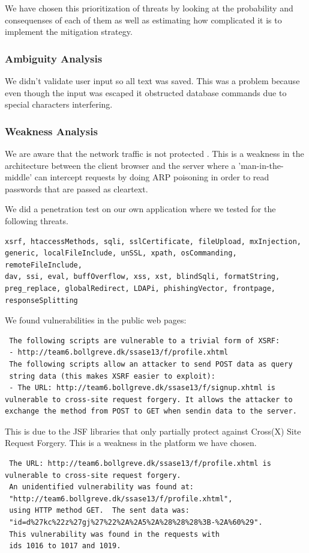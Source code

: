 \documentclass[a4paper]{article}
\begin{document}
We have chosen this prioritization of threats by looking at the probability and consequenses of each of them as well as estimating how complicated it is to implement the mitigation strategy.



\subsubsection{Ambiguity Analysis}

We didn't validate user input so all text was saved. This was a problem because even though the input was escaped it obstructed database commands due to special characters interfering.

\subsubsection{Weakness Analysis}
We are aware that the network traffic is not protected \cite{sins2009}. This is a weakness in the architecture between the client browser and the server where a 'man-in-the-middle' can intercept requests by doing ARP poisoning in order to read passwords that are passed as cleartext.

We did a penetration test on our own application where we tested for the following threats.

\begin{verbatim}
xsrf, htaccessMethods, sqli, sslCertificate, fileUpload, mxInjection, 
generic, localFileInclude, unSSL, xpath, osCommanding, remoteFileInclude, 
dav, ssi, eval, buffOverflow, xss, xst, blindSqli, formatString, 
preg_replace, globalRedirect, LDAPi, phishingVector, frontpage, 
responseSplitting
\end{verbatim}
     
We found vulnerabilities in the public web pages:
\begin{verbatim}
 The following scripts are vulnerable to a trivial form of XSRF:
 - http://team6.bollgreve.dk/ssase13/f/profile.xhtml
 The following scripts allow an attacker to send POST data as query 
 string data (this makes XSRF easier to exploit):
 - The URL: http://team6.bollgreve.dk/ssase13/f/signup.xhtml is 
vulnerable to cross-site request forgery. It allows the attacker to 
exchange the method from POST to GET when sendin data to the server.
\end{verbatim}
This is due to the JSF libraries that only partially protect against Cross(X) Site Request Forgery. This is a weakness in the platform we have chosen.
\begin{verbatim}
 The URL: http://team6.bollgreve.dk/ssase13/f/profile.xhtml is 
vulnerable to cross-site request forgery.
 An unidentified vulnerability was found at: 
 "http://team6.bollgreve.dk/ssase13/f/profile.xhtml", 
 using HTTP method GET.  The sent data was:
 "id=d%27kc%22z%27gj%27%22%2A%2A5%2A%28%28%28%3B-%2A%60%29". 
 This vulnerability was found in the requests with 
 ids 1016 to 1017 and 1019.
\end{verbatim}
\end{document}
